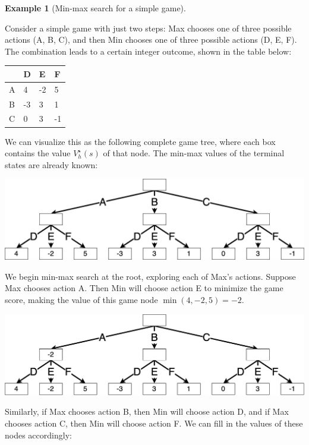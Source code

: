 \documentclass[
  letterpaper,
  DIV=11,
  numbers=noendperiod]{scrreprt}
\theoremstyle{plain}
\theoremstyle{plain}
\theoremstyle{definition}
\newtheorem{example}{Example}[chapter]
\theoremstyle{definition}
\theoremstyle{remark}
\begin{document}
\begin{example}[Min-max search for a simple
game]\protect\hypertarget{exm-min-max-example}{}\label{exm-min-max-example}

Consider a simple game with just two steps: Max chooses one of three
possible actions (A, B, C), and then Min chooses one of three possible
actions (D, E, F). The combination leads to a certain integer outcome,
shown in the table below:

\begin{longtable}[]{@{}llll@{}}
\toprule\noalign{}
& D & E & F \\
\midrule\noalign{}
\endhead
\bottomrule\noalign{}
\endlastfoot
A & 4 & -2 & 5 \\
B & -3 & 3 & 1 \\
C & 0 & 3 & -1 \\
\end{longtable}

We can visualize this as the following complete game tree, where each
box contains the value \(V_h^\star(s)\) of that node. The min-max values
of the terminal states are already known:

\includegraphics{./shared/minmax.png}

We begin min-max search at the root, exploring each of Max's actions.
Suppose Max chooses action A. Then Min will choose action E to minimize
the game score, making the value of this game node
\(\min(4, -2, 5) = -2\).

\includegraphics{./shared/minmax-2.png}

Similarly, if Max chooses action B, then Min will choose action D, and
if Max chooses action C, then Min will choose action F. We can fill in
the values of these nodes accordingly:


\end{example}
\end{document}

